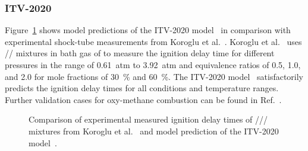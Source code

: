 \begin{refsection}
\subsubsection{ITV-2020}
Figure~\ref{fig:B1bIDTLimingCaiCoalMechanism} shows model predictions of the ITV-2020 model~\cite{Cai2020} in comparison with experimental shock-tube measurements from Koroglu et al.~\cite{Koroglu2016}. Koroglu et al.~\cite{Koroglu2016} uses // mixtures in bath gas of  to measure the ignition delay time for different pressures in the range of \SI{0.61}{atm} to \SI{3.92}{atm} and equivalence ratios of 0.5, 1.0, and 2.0 for  mole fractions of \SI{30}{\%} and \SI{60}{\%}. The ITV-2020 model~\cite{Cai2020} satisfactorily predicts the ignition delay times for all conditions and temperature ranges.
\\
Further validation cases for oxy-methane combustion can be found in Ref.~\cite{Cai2020}.
\begin{figure}[h]
  \centering
  \hfill
  \hfill
  \hfill
  \caption{Comparison of experimental measured ignition delay times of /// mixtures from Koroglu et al.~\cite{Koroglu2016} and model prediction of the ITV-2020 model~\cite{Cai2020}.}
  \label{fig:B1bIDTLimingCaiCoalMechanism}
\end{figure}




\end{refsection}
